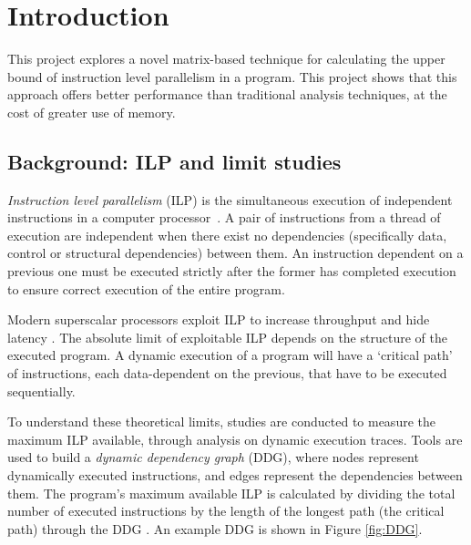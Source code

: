 \chapter{Introduction}

This project explores a novel matrix-based technique for calculating the upper bound of instruction level parallelism
in a program. This project shows that this approach offers better performance than traditional analysis techniques,
at the cost of greater use of memory.

\section{Background: ILP and limit studies} \label{intro:background}

\textit{Instruction level parallelism} (ILP) is the simultaneous execution of independent instructions in a computer processor~\cite{hennessy_patterson}.
A pair of instructions from a thread of execution are independent when there exist no dependencies (specifically data,
control or structural dependencies) between them. An instruction dependent on a previous one must be executed strictly
after the former has completed execution to ensure correct execution of the entire program.

Modern superscalar processors exploit ILP to increase throughput and hide latency \cite{shen2013modern}. The absolute limit of 
exploitable ILP depends on the structure of the executed program. A dynamic execution of a program will have a
`critical path' of instructions, each data-dependent on the previous, that have to be executed sequentially.

To understand these theoretical limits, studies are conducted to measure the maximum ILP available, through analysis 
on dynamic execution traces. Tools are used to build a \textit{dynamic dependency graph} (DDG), where nodes represent dynamically 
executed instructions, and edges represent the dependencies between them. The program's maximum available ILP is 
calculated by dividing the total number of executed instructions by the length of the longest path (the critical path)
through the DDG \cite{wall-ilp}. An example DDG is shown in Figure \ref{fig:DDG}.

